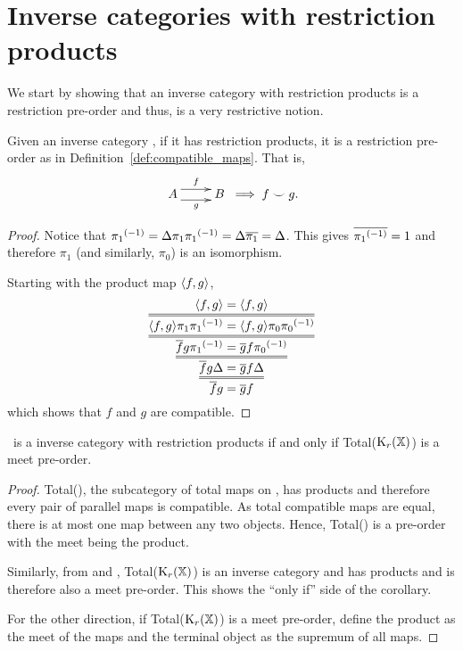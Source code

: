 \section{Inverse categories with restriction products} %
\label{sec:inverse_categories_with_restriction_products}
We start by showing that an inverse category with restriction products is a restriction pre-order
and thus, is a very restrictive notion.
\begin{proposition}\label{prop:an_inverse_category_with_products_is_a_restriction_preorder}
  Given an inverse category \X, if it has restriction products, it is a restriction pre-order as in
  Definition~\ref{def:compatible_maps}. That is,
  \[
    \xymatrix {
      A  \ar@<1ex>[r]^{f} \ar@<-1ex>[r]_{g} &B
    }
    \implies f \compatible g.
  \]
\end{proposition}
\begin{proof}
  Notice that $ {\pi_1}^{(-1)}  = \Delta \pi_1 {\pi_1}^{(-1)} =\Delta \overline{\pi_1} = \Delta$.
  This gives $\overline{{\pi_1}^{(-1)}} = 1$ and therefore $\pi_1$ (and similarly, $\pi_0$) is an
  isomorphism.

  Starting with the product map $\langle f,g\rangle$,
  \[
    \infer={\restr{f}g = \restr{g}f}
    {\infer={\restr{f}g\Delta = \restr{g}f\Delta}
    {\infer={\restr{f}g\inv{\pi_1} = \restr{g}f\inv{\pi_0}}
    {\infer={\<f,g\>\pi_1 \inv{\pi_1} = \<f,g\>\pi_0 \inv{\pi_0}}
    {\<f,g\> = \<f,g\>}}}}
  \]
  which shows that $f$ and $g$ are compatible.
\end{proof}

\begin{corollary}
  \X\ is a inverse category with restriction products if and only if Total($\text{K}_{r}(\mathbb{X})$) is a meet pre-order.
\end{corollary}

\begin{proof}
  Total(\X), the subcategory of total maps on \X, has products and therefore every pair of parallel
  maps is compatible. As total compatible maps are equal, there is at most
  one map between any two objects. Hence, Total(\X) is a pre-order with the meet being the product.

  Similarly, from \cite{cockett2002:restcategories1} and \cite{cockettlack2004:restcategories3},
  Total($\text{K}_{r}(\mathbb{X})$) is an inverse category and has products and is therefore also a meet
  pre-order. This shows the ``only if'' side of the corollary.

  For the other direction, if Total($\text{K}_{r}(\mathbb{X})$) is a meet pre-order, define the product as the
  meet of the maps and the terminal object as the supremum of all maps.
\end{proof}

